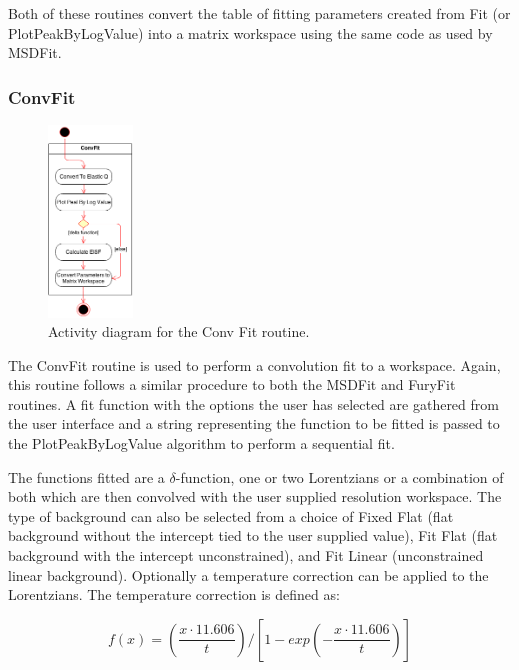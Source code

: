 \documentclass[paper=a4, fontsize=11pt]{scrartcl}	%
\numberwithin{equation}{section}															%
\numberwithin{figure}{section}																%
\numberwithin{table}{section}																%
\begin{document}
Both of these routines convert the table of fitting parameters created from Fit (or PlotPeakByLogValue) into a matrix workspace using the same code as used by MSDFit.

\subsubsection{ConvFit}
\label{subsubsec:convfit}

\begin{figure}[H]
\centering
\includegraphics[width=0.2\textwidth]{img/uml/activity_diagrams/ConvFit_activity.png}
\caption{Activity diagram for the Conv Fit routine.}
\label{fig:conv-fit-activity-diagram}
\end{figure}

The ConvFit routine is used to perform a convolution fit to a workspace. Again, this routine follows a similar procedure to both the MSDFit and FuryFit routines. A fit function with the options the user has selected are gathered from the user interface and a string representing the function to be fitted is passed to the PlotPeakByLogValue algorithm to perform a sequential fit.

The functions fitted are a $\delta$-function, one or two Lorentzians or a combination of both which are then convolved with the user supplied resolution workspace. The type of background can also be selected from a choice of Fixed Flat (flat background without the intercept tied to the user supplied value), Fit Flat (flat background with the intercept unconstrained), and Fit Linear (unconstrained linear background). Optionally a temperature correction can be applied to the Lorentzians. The temperature correction is defined as:

\begin{equation}
f(x) = (\frac{x \cdot 11.606}{t}) / [1 - exp(-\frac{x \cdot 11.606}{t})]
\end{equation}
\end{document}
